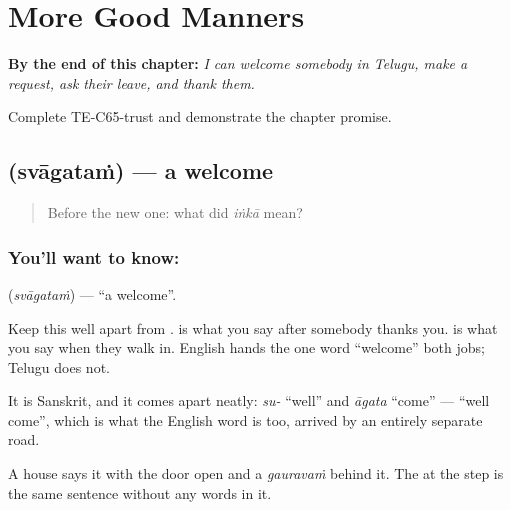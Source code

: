 
\chapter{More Good Manners}
\label{ch:te-more-manners}

\begin{chapteropening}
\textbf{By the end of this chapter:} \emph{I can welcome somebody in Telugu, make a request, ask their leave, and thank them.}

Complete TE-C65-trust and demonstrate the chapter promise.
\end{chapteropening}

\section[\texorpdfstring{\te{స్వాగతం} (svāgataṁ)}{స్వాగతం (svāgataṁ)}]{ (svāgataṁ) — a welcome}

\label{lesson:TE-C65-welcome}



\begin{quote}
Before the new one: what did \emph{iṅkā} mean?
\end{quote}

\subsection*{You'll want to know: }
\textbf{} (\emph{svāgataṁ}) — \textquotedblleft{}a welcome\textquotedblright{}.

Keep this well apart from .  is what you say after somebody thanks you.  is what you say when they walk in. English hands the one word \textquotedblleft{}welcome\textquotedblright{} both jobs; Telugu does not.

It is Sanskrit, and it comes apart neatly: \emph{su-} \textquotedblleft{}well\textquotedblright{} and \emph{āgata} \textquotedblleft{}come\textquotedblright{} — \textquotedblleft{}well come\textquotedblright{}, which is what the English word is too, arrived by an entirely separate road.

A house says it with the door open and a \emph{gauravaṁ} behind it. The  at the step is the same sentence without any words in it.

